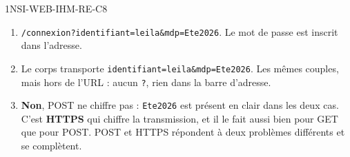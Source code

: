 \begin{corrige}{1NSI-WEB-IHM-RE-C8}
\begin{enumerate}
  \item \lstinline{/connexion?identifiant=leila&mdp=Ete2026}. Le mot de passe est inscrit dans
        l'adresse.
  \item Le corps transporte \lstinline{identifiant=leila&mdp=Ete2026}. Les mêmes couples, mais
        hors de l'URL : aucun \lstinline{?}, rien dans la barre d'adresse.
  \item \textbf{Non}, POST ne chiffre pas : \lstinline{Ete2026} est présent en clair dans les
        deux cas. C'est \textbf{HTTPS} qui chiffre la transmission, et il le fait aussi bien
        pour GET que pour POST. POST et HTTPS répondent à deux problèmes différents et se
        complètent.
\end{enumerate}
\end{corrige}
